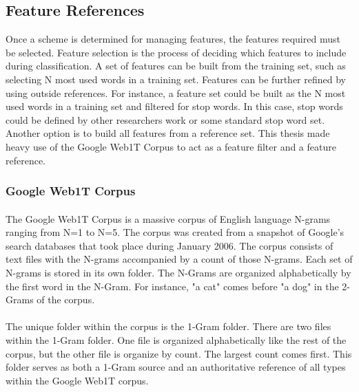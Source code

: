 	\subsection {Feature References} Once a scheme is determined for managing features, the features required must be selected. Feature selection is the process of deciding which features to include during classification. A set of features can be built from the training set, such as selecting N most used words in a training set.  Features can be further refined by using outside references.  For instance, a feature set could be built as the N most used words in a training set and filtered for stop words.  In this case, stop words could be defined by other researchers work or some standard stop word set.  Another option is to build all features from a reference set.  This thesis made heavy use of the Google Web1T Corpus to act as a feature filter and a feature reference.

	\subsubsection{Google Web1T Corpus}
		\paragraph{} The Google Web1T Corpus is a massive corpus of English language N-grams ranging from N=1 to N=5.  The corpus was created from a snapshot of Google's search databases that took place during January 2006.  The corpus consists of text files with the N-grams accompanied by a count of those N-grams.  Each set of N-grams is stored in its own folder.  The N-Grams are organized alphabetically by the first word in the N-Gram.  For instance, "a cat" comes before "a dog" in the 2-Grams of the corpus.  
		\paragraph{} The unique folder within the corpus is the 1-Gram folder.  There are two files within the 1-Gram folder.  One file is organized alphabetically like the rest of the corpus, but the other file is organize by count.  The largest count comes first. This folder serves as both a 1-Gram source and an authoritative reference of all types within the Google Web1T corpus.
